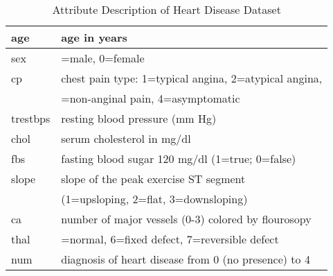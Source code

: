 \documentclass{article}
\begin{document}
\renewcommand{\tabcolsep}{.15cm}
\begin{table}[t]
\caption{Attribute Description of Heart Disease Dataset }
\centering
\renewcommand{\arraystretch}{1.3}
\begin{tabular}{|l | l|}
\hline
\; age& \; age in years \\
\hline
\; sex&\; 1=male, 0=female \\ 
\hline
\; cp &\; chest pain type: 1=typical angina, 2=atypical angina,\\
&\;  3=non-anginal pain, 4=asymptomatic \\
\hline
 \; trestbps&\; resting blood pressure (mm Hg)\\
\hline
\; chol&\; serum cholesterol in mg/dl\\
\hline
 \; fbs&\; fasting blood sugar  120 mg/dl (1=true; 0=false) \\
\hline
\; slope&\; slope of the peak exercise ST segment \\
         &\; (1=upsloping, 2=flat, 3=downsloping) \\
\hline
 \; ca&\; number of major vessels (0-3) colored by flourosopy \\
\hline
 \; thal&\; 3=normal, 6=fixed defect, 7=reversible defect\\
\hline
 \; num&\; diagnosis of heart disease  from 0 (no presence) to 4\\
\hline 
\end{tabular}
\label{table:map}
\end{table}
\end{document}
